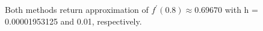 \begin{exercise}{5}
\begin{longtable}[c]{|r|r|r|}
\label{my-label}\\
\end{longtable}

Both methods return approximation of $f^\prime(0.8) \approx 0.69670$ with h = 0.00001953125 and 0.01, respectively.

\end{exercise}
